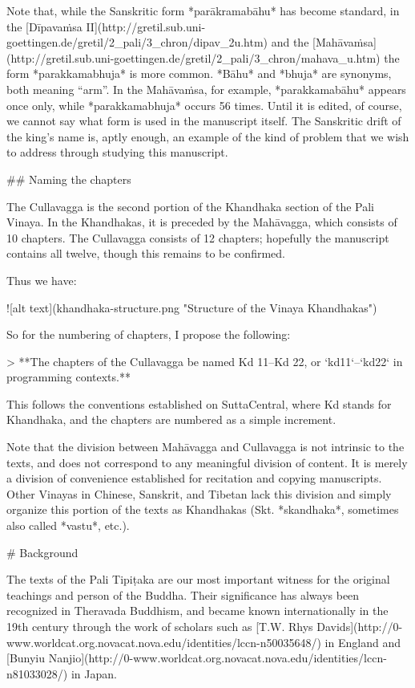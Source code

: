 \documentclass[11pt, openany,a5paper]{article}
\begin{document}
\begin{markdown}
Note that, while the Sanskritic form *parākramabāhu* has become standard, in the [Dīpavaṁsa II](http://gretil.sub.uni-goettingen.de/gretil/2_pali/3_chron/dipav_2u.htm) and the [Mahāvaṁsa](http://gretil.sub.uni-goettingen.de/gretil/2_pali/3_chron/mahava_u.htm) the form *parakkamabhuja* is more common. *Bāhu* and *bhuja* are synonyms, both meaning “arm”. In the Mahāvaṁsa, for example, *parakkamabāhu* appears once only, while *parakkamabhuja* occurs 56 times. Until it is edited, of course, we cannot say what form is used in the manuscript itself. The Sanskritic drift of the king’s name is, aptly enough, an example of the kind of problem that we wish to address through studying this manuscript.

## Naming the chapters

The Cullavagga is the second portion of the Khandhaka section of the Pali Vinaya. In the Khandhakas, it is preceded by the Mahāvagga, which consists of 10 chapters. The Cullavagga consists of 12 chapters; hopefully the manuscript contains all twelve, though this remains to be confirmed.

Thus we have:

![alt text](khandhaka-structure.png "Structure of the Vinaya Khandhakas")

So for the numbering of chapters, I propose the following:

> **The chapters of the Cullavagga be named Kd 11–Kd 22, or `kd11`–`kd22` in programming contexts.**

This follows the conventions established on SuttaCentral, where Kd stands for Khandhaka, and the chapters are numbered as a simple increment.

Note that the division between Mahāvagga and Cullavagga is not intrinsic to the texts, and does not correspond to any meaningful division of content. It is merely a division of convenience established for recitation and copying manuscripts. Other Vinayas in Chinese, Sanskrit, and Tibetan lack this division and simply organize this portion of the texts as Khandhakas (Skt. *skandhaka*, sometimes also called *vastu*, etc.).

# Background

The texts of the Pali Tipiṭaka are our most important witness for the original teachings and person of the Buddha. Their significance has always been recognized in Theravada Buddhism, and became known internationally in the 19th century through the work of scholars such as [T.W. Rhys Davids](http://0-www.worldcat.org.novacat.nova.edu/identities/lccn-n50035648/) in England and [Bunyiu Nanjio](http://0-www.worldcat.org.novacat.nova.edu/identities/lccn-n81033028/) in Japan.


\end{markdown}
\end{document}
